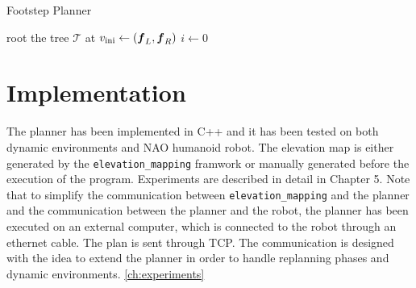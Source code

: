 \begin{algorithm}
  \caption{Footstep Planner}
  \label{alg:footstep-planner}
  root the tree $\mathcal{T}$ at $v_{\rm ini} \leftarrow ({\mbox{\boldmath $f$}}_L, {\mbox{\boldmath $f$}}_R)$\;
  $i \leftarrow 0$\;
\end{algorithm}

\section{Implementation}
The planner has been implemented in C++ and it has been tested on both dynamic 
environments and NAO humanoid robot. The elevation map is either
generated by the 
\texttt{elevation\_mapping} framwork or manually generated before the execution 
of the program. Experiments are described in detail in Chapter 5. Note that to 
simplify the communication between \texttt{elevation\_mapping} and the planner 
and the communication between the planner and the robot, the planner has been 
executed on an external computer, which is connected to the robot through 
an ethernet cable. The plan is sent through TCP. The communication is designed 
with the idea to extend the planner in order to handle replanning phases and
dynamic environments.
\ref{ch:experiments} 
